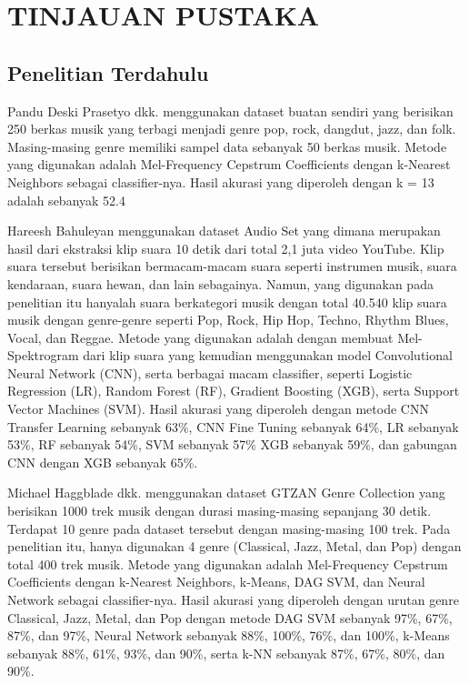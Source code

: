 \chapter{TINJAUAN PUSTAKA}
\label{chap:tinjauanpustaka}


\section{Penelitian Terdahulu}
\label{sec:penelitianterdahulu}

Pandu Deski Prasetyo dkk. \citep{prasetyo} menggunakan dataset buatan sendiri yang berisikan 250 berkas musik yang terbagi menjadi genre pop, rock, dangdut, jazz, dan folk. Masing-masing genre memiliki sampel data sebanyak 50 berkas musik. Metode yang digunakan adalah Mel-Frequency Cepstrum Coefficients dengan k-Nearest Neighbors sebagai classifier-nya. Hasil akurasi yang diperoleh dengan k = 13 adalah sebanyak 52.4%

Hareesh Bahuleyan \citep{DBLP:journals/corr/abs-1804-01149} menggunakan dataset Audio Set yang dimana merupakan hasil dari ekstraksi klip suara 10 detik dari total 2,1 juta video YouTube. Klip suara tersebut berisikan bermacam-macam suara seperti instrumen musik, suara kendaraan, suara hewan, dan lain sebagainya. Namun, yang digunakan pada penelitian itu hanyalah suara berkategori musik dengan total 40.540 klip suara musik dengan genre-genre seperti Pop, Rock, Hip Hop, Techno, Rhythm Blues, Vocal, dan Reggae. Metode yang digunakan adalah dengan membuat Mel-Spektrogram dari klip suara yang kemudian menggunakan model Convolutional Neural Network (CNN), serta berbagai macam classifier, seperti Logistic Regression (LR), Random Forest (RF), Gradient Boosting (XGB), serta Support Vector Machines (SVM). Hasil akurasi yang diperoleh dengan metode CNN Transfer Learning sebanyak 63\%, CNN Fine Tuning sebanyak 64\%, LR sebanyak 53\%, RF sebanyak 54\%, SVM sebanyak 57\% XGB sebanyak 59\%, dan gabungan CNN dengan XGB sebanyak 65\%.

Michael Haggblade dkk. \citep{Haggblade2011MusicGC} menggunakan dataset GTZAN Genre Collection yang berisikan 1000 trek musik dengan durasi masing-masing sepanjang 30 detik. Terdapat 10 genre pada dataset tersebut dengan masing-masing 100 trek. Pada penelitian itu, hanya digunakan 4 genre (Classical, Jazz, Metal, dan Pop) dengan total 400 trek musik. Metode yang digunakan adalah Mel-Frequency Cepstrum Coefficients dengan k-Nearest Neighbors, k-Means, DAG SVM, dan Neural Network sebagai classifier-nya. Hasil akurasi yang diperoleh dengan urutan genre Classical, Jazz, Metal, dan Pop dengan metode DAG SVM sebanyak 97\%, 67\%, 87\%, dan 97\%, Neural Network sebanyak 88\%, 100\%, 76\%, dan 100\%, k-Means sebanyak 88\%, 61\%, 93\%, dan 90\%, serta k-NN sebanyak 87\%, 67\%, 80\%, dan 90\%.

